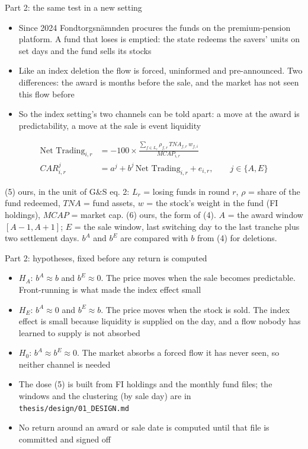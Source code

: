 \documentclass[aspectratio=169]{beamer}
\newcommand{\src}[1]{{\scriptsize\color{gray}#1\par}}
\begin{document}
\begin{frame}{Part 2: the same test in a new setting}
  \begin{itemize}
    \item Since 2024 Fondtorgsnämnden procures the funds on the premium-pension
      platform. A fund that loses is emptied: the state redeems the savers' units on
      set days and the fund sells its stocks
    \item Like an index deletion the flow is forced, uninformed and pre-announced.
      Two differences: the award is months before the sale, and the market has not
      seen this flow before
    \item So the index setting's two channels can be told apart: a move at the award
      is predictability, a move at the sale is event liquidity
  \end{itemize}
  \begin{align}
    \text{Net Trading}_{i,r} &= -100 \times \frac{\sum_{f \in L_r} \rho_{f,r}\, TNA_{f,r}\, w_{f,i}}{MCAP_{i,r}} \\[2pt]
    CAR^{j}_{i,r} &= a^{j} + b^{j}\,\text{Net Trading}_{i,r} + e_{i,r}, \qquad j \in \{A, E\}
  \end{align}
  \src{(5) ours, in the unit of G\&S eq. 2: $L_r$ = losing funds in round $r$, $\rho$ = share of the fund
  redeemed, $TNA$ = fund assets, $w$ = the stock's weight in the fund (FI holdings), $MCAP$ = market cap.
  (6) ours, the form of (4). $A$ = the award window $[A-1, A+1]$; $E$ = the sale window, last switching
  day to the last tranche plus two settlement days. $b^A$ and $b^E$ are compared with $b$ from (4) for deletions.}
\end{frame}

\begin{frame}{Part 2: hypotheses, fixed before any return is computed}
  \begin{itemize}
    \item $H_A$: $b^A \approx b$ and $b^E \approx 0$. The price moves when the sale
      becomes predictable. Front-running is what made the index effect small
    \item $H_E$: $b^A \approx 0$ and $b^E \approx b$. The price moves when the stock
      is sold. The index effect is small because liquidity is supplied on the day,
      and a flow nobody has learned to supply is not absorbed
    \item $H_0$: $b^A \approx b^E \approx 0$. The market absorbs a forced flow it has
      never seen, so neither channel is needed
  \end{itemize}
  \bigskip
  \begin{itemize}
    \item The dose (5) is built from FI holdings and the monthly fund files; the windows
      and the clustering (by sale day) are in \texttt{thesis/design/01\_DESIGN.md}
    \item No return around an award or sale date is computed until that file is
      committed and signed off
  \end{itemize}
\end{frame}
\end{document}
